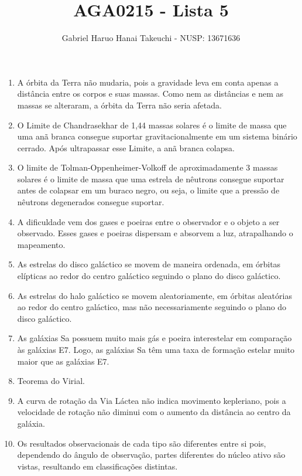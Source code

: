 \documentclass{article}
\author{Gabriel Haruo Hanai Takeuchi - NUSP: 13671636}
\title{AGA0215 - Lista 5}
\date{}
\begin{document}
\maketitle

\begin{enumerate}
  \item A órbita da Terra não mudaria, pois a gravidade leva em conta apenas a distância entre os corpos e suas massas. Como nem as distâncias e nem as massas se alteraram, a órbita da Terra não seria afetada.
  \item O Limite de Chandrasekhar de 1,44 massas solares é o limite de massa que uma anã branca consegue suportar gravitacionalmente em um sistema binário cerrado. Após ultrapassar esse Limite, a anã branca colapsa.
  \item O limite de Tolman-Oppenheimer-Volkoff de aproximadamente 3 massas solares é o limite de massa que uma estrela de nêutrons consegue suportar antes de colapsar em um buraco negro, ou seja, o limite que a pressão de nêutrons degenerados consegue suportar.
  \item A dificuldade vem dos gases e poeiras entre o observador e o objeto a ser observado. Esses gases e poeiras dispersam e absorvem a luz, atrapalhando o mapeamento.
  \item As estrelas do disco galáctico se movem de maneira ordenada, em órbitas elípticas ao redor do centro galáctico seguindo o plano do disco galáctico.
  \item As estrelas do halo galáctico se movem aleatoriamente, em órbitas aleatórias ao redor do centro galáctico, mas não necessariamente seguindo o plano do disco galáctico.
  \item As galáxias Sa possuem muito mais gás e poeira interestelar em comparação às galáxias E7. Logo, as galáxias Sa têm uma taxa de formação estelar muito maior que as galáxias E7.
  \item Teorema do Virial.
  \item A curva de rotação da Via Láctea não indica movimento kepleriano, pois a velocidade de rotação não diminui com o aumento da distância ao centro da galáxia.
  \item Os resultados observacionais de cada tipo são diferentes entre si pois, dependendo do ângulo de observação, partes diferentes do núcleo ativo são vistas, resultando em classificações distintas.
\end{enumerate}
\end{document}
